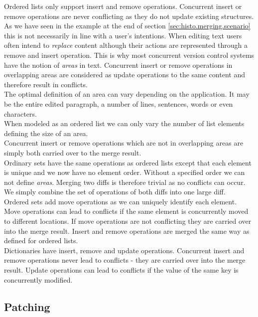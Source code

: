 Ordered lists only support insert and remove operations.
Concurrent insert or remove operations are never conflicting as they do not update existing structures.
As we have seen in the example at the end of section \ref{sec:histo.merging.scenario} this is not necessarily in line with a user's intentions.
When editing text users often intend to \emph{replace} content although their actions are represented through a remove and insert operation.
This is why most concurrent version control systems have the notion of \emph{areas} in text.
Concurrent insert or remove operations in overlapping areas are considered as update operations to the same content and therefore result in conflicts.\\
The optimal definition of an area can vary depending on the application.
It may be the entire edited paragraph, a number of lines, sentences, words or even characters.\\
When modeled as an ordered list we can only vary the number of list elements defining the size of an area.\\
Concurrent insert or remove operations which are not in overlapping areas are simply both carried over to the merge result.\\

Ordinary sets have the same operations as ordered lists except that each element is unique and we now have no element order.
Without a specified order we can not define \emph{areas}.
Merging two diffs is therefore trivial as no conflicts can occur.
We simply combine the set of operations of both diffs into one large diff.\\

Ordered sets add move operations as we can uniquely identify each element.
Move operations can lead to conflicts if the same element is concurrently moved to different locations.
If move operations are not conflicting they are carried over into the merge result.
Insert and remove operations are merged the same way as defined for ordered lists.\\

Dictionaries have insert, remove and update operations.
Concurrent insert and remove operations never lead to conflicts - they are carried over into the merge result.
Update operations can lead to conflicts if the value of the same key is concurrently modified.

\subsection{Patching}
\label{sec:histo.merging.patching}

